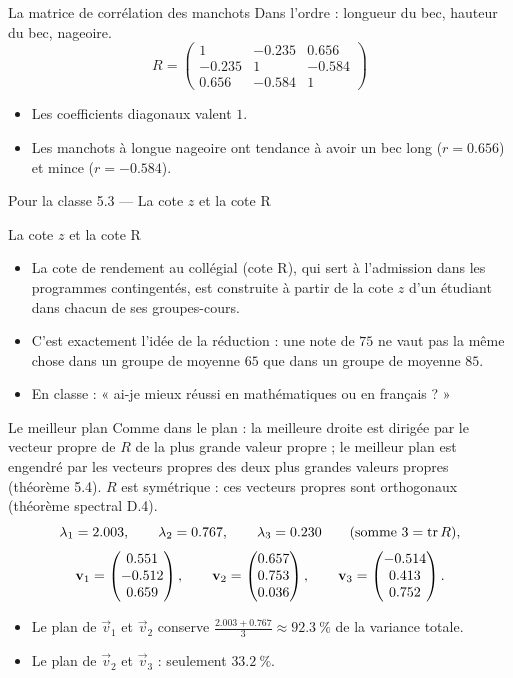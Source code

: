 \begin{frame}{La matrice de corrélation des manchots}
  Dans l'ordre : longueur du bec, hauteur du bec, nageoire.
  \[
    R=\begin{pmatrix}
      1 & -\num{0.235} & \num{0.656}\\
      -\num{0.235} & 1 & -\num{0.584}\\
      \num{0.656} & -\num{0.584} & 1
    \end{pmatrix}
  \]
  \begin{itemize}
    \item Les coefficients diagonaux valent $1$.
    \item Les manchots à longue nageoire ont tendance à avoir un bec long
      ($r=\num{0.656}$) et mince ($r=-\num{0.584}$).
  \end{itemize}
\end{frame}

\begin{frame}{Pour la classe 5.3 --- La cote $z$ et la cote R}
  \begin{Classe}{La cote $z$ et la cote R}
    \begin{itemize}
      \item La cote de rendement au collégial (cote R), qui sert à
        l'admission dans les programmes contingentés, est construite à
        partir de la cote $z$ d'un étudiant dans chacun de ses groupes-cours.
      \item C'est exactement l'idée de la réduction : une note de $75$ ne
        vaut pas la même chose dans un groupe de moyenne $65$ que dans un
        groupe de moyenne $85$.
      \item En classe : « ai-je mieux réussi en mathématiques ou en
        français ? »
    \end{itemize}
  \end{Classe}
\end{frame}

\begin{frame}{Le meilleur plan}
  \small Comme dans le plan : la meilleure droite est dirigée par le vecteur
  propre de $R$ de la plus grande valeur propre ; le meilleur plan est
  engendré par les vecteurs propres des deux plus grandes valeurs propres
  (théorème 5.4). $R$ est symétrique : ces vecteurs propres sont
  orthogonaux (théorème spectral D.4).
  \[
    \lambda_1=\num{2.003},\qquad\lambda_2=\num{0.767},\qquad\lambda_3=\num{0.230}
    \qquad(\text{somme }3=\operatorname{tr} R),
  \]
  \[
    \mathbf{v}_1=\begin{pmatrix}\num{0.551}\\ -\num{0.512}\\ \num{0.659}\end{pmatrix},\qquad
    \mathbf{v}_2=\begin{pmatrix}\num{0.657}\\ \num{0.753}\\ \num{0.036}\end{pmatrix},\qquad
    \mathbf{v}_3=\begin{pmatrix}-\num{0.514}\\ \num{0.413}\\ \num{0.752}\end{pmatrix} .
  \]
  \begin{itemize}
    \item Le plan de $\vec v_1$ et $\vec v_2$ conserve
      $\frac{\num{2.003}+\num{0.767}}{3}\approx\SI{92.3}{\percent}$ de la
      variance totale.
    \item Le plan de $\vec v_2$ et $\vec v_3$ : seulement
      $\SI{33.2}{\percent}$.
  \end{itemize}
\end{frame}

